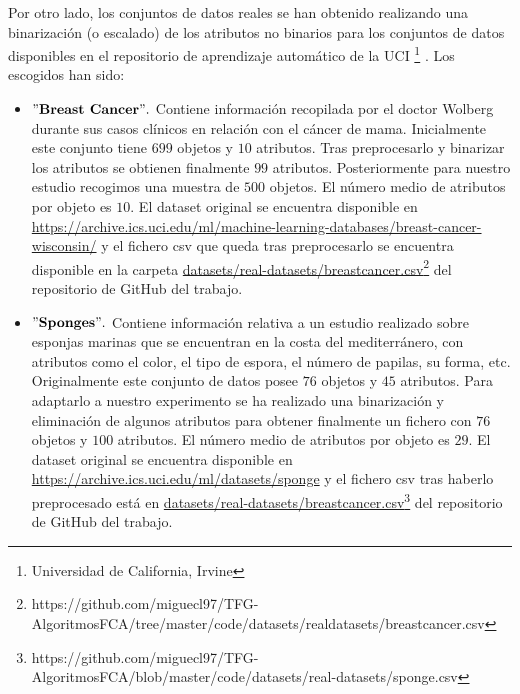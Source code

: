 \documentclass[oneside,openright,titlepage,numbers=noenddot,openany,headinclude,footinclude=true,
cleardoublepage=empty,abstractoff,BCOR=5mm,paper=a4,fontsize=12pt,main=spanish]{scrreprt}
\begin{document}
Por otro lado, los conjuntos de datos reales se han obtenido realizando una binarización \cite{binarization} (o escalado) de los atributos no binarios para los conjuntos de datos disponibles en el repositorio de aprendizaje automático de la UCI \footnote{Universidad de California, Irvine} \cite{uci}. Los escogidos  han sido:

\begin{itemize}
    \item $"\textbf{Breast Cancer}".$ Contiene información recopilada por el doctor Wolberg \cite{breast} durante sus casos clínicos en relación con el cáncer de mama. Inicialmente este conjunto tiene $699$ objetos y $10$ atributos. Tras preprocesarlo y binarizar los atributos se obtienen finalmente $99$ atributos. Posteriormente para nuestro estudio recogimos una muestra de $500$ objetos. El número medio de atributos por objeto es $10$. El dataset original se encuentra disponible en \href{https://archive.ics.uci.edu/ml/machine-learning-databases/breast-cancer-wisconsin/}{https://archive.ics.uci.edu/\linebreak ml/machine-learning-databases/breast-cancer-wisconsin/} y el fichero csv que queda tras preprocesarlo se encuentra disponible en la carpeta \href{https://github.com/miguecl97/TFG-AlgoritmosFCA/tree/master/code/datasets/real-datasets/breastcancer.csv}{datasets/real-datasets/breastcancer.csv}\footnote{https://github.com/miguecl97/TFG-AlgoritmosFCA/tree/master/code/datasets/real\-datasets/breastcancer.csv} del repositorio de GitHub del trabajo.
    \item $"\textbf{Sponges}".$ Contiene información relativa a un estudio realizado sobre esponjas marinas que se encuentran en la costa del mediterránero, con atributos como el color, el tipo de espora, el número de papilas, su forma, etc. Originalmente este conjunto de datos posee $76$ objetos y $45$ atributos. Para adaptarlo a nuestro experimento se ha realizado una binarización y eliminación de algunos atributos para obtener finalmente un fichero con $76$ objetos y $100$ atributos. El número medio de atributos por objeto es $29$. El dataset original se encuentra disponible en \href{https://archive.ics.uci.edu/ml/datasets/sponge}{https://archive.ics.uci.edu/ml/datasets/sponge} y el fichero csv tras haberlo preprocesado está en \href{https://github.com/miguecl97/TFG-AlgoritmosFCA/blob/master/code/datasets/real-datasets/sponge.csv}{datasets/real-datasets/breastcancer.csv}\footnote{https://github.com/miguecl97/TFG-AlgoritmosFCA/blob/master/code/datasets/real-datasets/sponge.csv} del repositorio de GitHub del trabajo.
\end{itemize}
\end{document}
